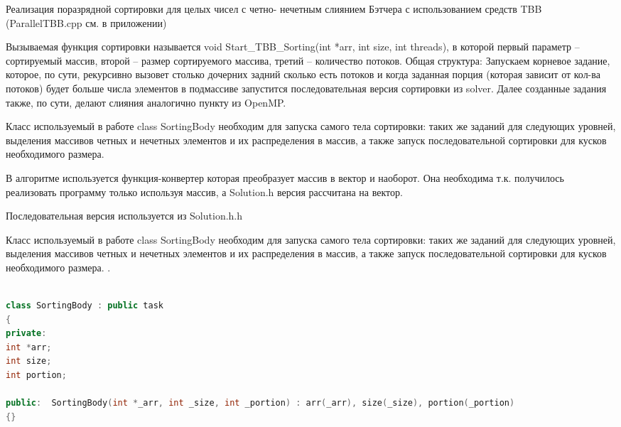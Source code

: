 \documentclass[a4paper,final]{report}
\begin{document}
\begin{spacing}{1.5}
		\par Реализация поразрядной сортировки для целых чисел с четно- нечетным слиянием Бэтчера с использованием средств TBB (ParallelTBB.cpp см. в приложении) 
		\par Вызываемая функция сортировки называется void Start\_TBB\_Sorting(int *arr, int size, int threads), в которой первый параметр – сортируемый массив, второй –  размер сортируемого массива, третий – количество потоков.  Общая структура: Запускаем корневое задание, которое, по сути, рекурсивно вызовет столько дочерних задний сколько есть потоков и когда заданная порция (которая зависит от кол-ва потоков) будет больше числа элементов в подмассиве запустится последовательная версия сортировки из solver. Далее созданные задания также, по сути, делают слияния аналогично пункту из OpenMP.
		\par Класс используемый в работе class SortingBody необходим для запуска самого тела сортировки: таких же заданий для следующих уровней, выделения массивов четных и нечетных элементов и их распределения в массив, а также запуск последовательной сортировки для кусков необходимого размера.
		
		\par В алгоритме используется функция-конвертер которая преобразует массив в вектор и наоборот. Она необходима т.к. получилось реализовать программу только используя массив, а Solution.h версия рассчитана на вектор. 
		\par Последовательная версия используется из Solution.h.h
		\par Класс используемый в работе class SortingBody необходим для запуска самого тела сортировки: таких же заданий для следующих уровней, выделения массивов четных и нечетных элементов и их распределения в массив, а также запуск последовательной сортировки для кусков необходимого размера. 
 . \begin{spacing}{0}
\end{spacing}

\begin{lstlisting}[language=C++]

class SortingBody : public task
{ 
private:  
int *arr;  
int size;  
int portion; 
 
public:  SortingBody(int *_arr, int _size, int _portion) : arr(_arr), size(_size), portion(_portion)
{} 
 

\end{lstlisting}
\end{spacing}
\end{document}
